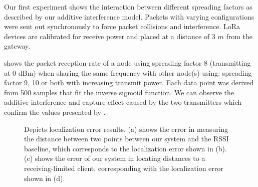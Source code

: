 Our first experiment shows the interaction between different spreading factors as described by our additive interference model. Packets with varying configurations were sent out synchronously to force packet collisions and interference.
LoRa devices are calibrated for receive power and placed at a distance of 3 $m$ from the gateway. 

 shows the packet reception rate of a node using spreading factor 8 (transmitting at 0 dBm) when sharing the same frequency with other node(s) using: spreading factor 9, 10 or both with increasing transmit power. Each data point was derived from 500 samples that fit the inverse sigmoid function. We can observe the additive interference and capture effect caused by the two transmitters which confirm the values presented by \cite{SemtechLoRaCommunity}.


\begin{figure}[!bht]
\centering

 \hfill
{} \hfill
{} \hfill
{}
\compactimg
\caption{Depicts localization error results. (a) shows the error in measuring the distance between two points between our system and the RSSI baseline, which corresponds to the localization error shown in (b). (c) shows the error of our system in locating distances to a receiving-limited client, corresponding with the localization error shown in (d).}
\label{fig:locres}
\end{figure}



